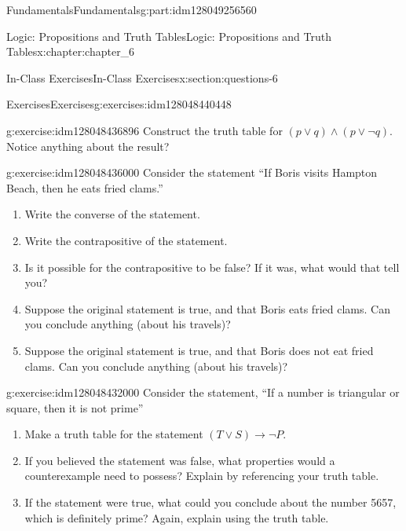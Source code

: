 \documentclass[oneside,10pt,]{book}
\numberwithin{equation}{section}
\begin{document}
\begin{partptx}{Fundamentals}{}{Fundamentals}{}{}{g:part:idm128049256560}
\begin{chapterptx}{Logic: Propositions and Truth Tables}{}{Logic: Propositions and Truth Tables}{}{}{x:chapter:chapter_6}
\begin{sectionptx}{In-Class Exercises}{}{In-Class Exercises}{}{}{x:section:questions-6}
\begin{exercises-subsection}{Exercises}{}{Exercises}{}{}{g:exercises:idm128048440448}
\begin{exercisegroup}
\begin{divisionexerciseeg}{2}{}{}{g:exercise:idm128048436896}%
Construct the truth table for \((p \lor q) \land (p\lor \neg q)\).   Notice anything about the result?%
\end{divisionexerciseeg}%
\begin{divisionexerciseeg}{3}{}{}{g:exercise:idm128048436000}%
Consider the statement “If Boris visits Hampton Beach, then he eats fried clams.”%
\begin{enumerate}[label=(\alph*)]
\item{}Write the converse of the statement.%
\item{}Write the contrapositive of the statement.%
\item{}Is it possible for the contrapositive to be false? If it was, what would that tell you?%
\item{}Suppose the original statement is true, and that Boris eats fried clams. Can you conclude anything (about his travels)?%
\item{}Suppose the original statement is true, and that Boris does not eat fried clams. Can you conclude anything (about his travels)?%
\end{enumerate}
%
\end{divisionexerciseeg}%
\begin{divisionexerciseeg}{4}{}{}{g:exercise:idm128048432000}%
Consider the statement, ``If a number is triangular or square, then it is not prime''%
\begin{enumerate}[label=(\alph*)]
\item{}Make a truth table for the statement \((T \vee S) \rightarrow \neg P\).%
\item{}If you believed the statement was false, what properties would a counterexample need to possess? Explain by referencing your truth table.%
\item{}If the statement were true, what could you conclude about the number 5657, which is definitely prime? Again, explain using the truth table.%
\end{enumerate}
%
\end{divisionexerciseeg}%
\end{exercisegroup}
\par\medskip\noindent
\end{exercises-subsection}
\end{sectionptx}
\end{chapterptx}
%
\typeout{************************************************}

\end{partptx}
\end{document}
